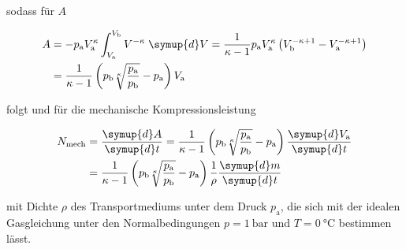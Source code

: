 sodass für $A$ 

\begin{equation}
    \begin{split}
        A &= - p_\text{a} V^\kappa_\text{a} \int^{V_\text{b}}_{V_\text{a}} V^{-\kappa}
        \; \symup{d}V = \frac{1}{\kappa - 1} p_\text{a} V^\kappa_\text{a} \left(
        V^{-\kappa + 1}_\text{b} - V^{-\kappa + 1}_\text{a} \right) \\
        &= \frac{1}{\kappa - 1} \left(p_\text{b} \sqrt[\kappa]{
        \frac{p_\text{a}}{p_\text{b}}} - p_\text{a}\right) V_\text{a}
    \end{split}
\end{equation}

folgt und für die mechanische Kompressionsleistung

\begin{equation}
    \begin{split}
        N_\text{mech} &= \frac{\symup{d}A}{\symup{d}t} = \frac{1}{\kappa - 1}
        \left(p_\text{b} \sqrt[\kappa]{ \frac{p_\text{a}}{p_\text{b}}} 
        - p_\text{a} \right) \frac{\symup{d}V_\text{a}}{\symup{d}t} \\
        &= \frac{1}{\kappa - 1} \left(p_\text{b} \sqrt[\kappa]{ 
        \frac{p_\text{a}}{p_\text{b}}} - p_\text{a}\right) \frac{1}{\rho}
        \frac{\symup{d}m}{\symup{d}t}
        \label{eqn:Kompressor}
    \end{split}
\end{equation}

mit Dichte $\rho$ des Transportmediums unter  dem Druck $p_\text{a}$, die sich
mit der idealen Gasgleichung unter den Normalbedingungen $p = \SI{1}{\bar}$ und
$T = \SI{0}{\celsius}$ bestimmen lässt.


